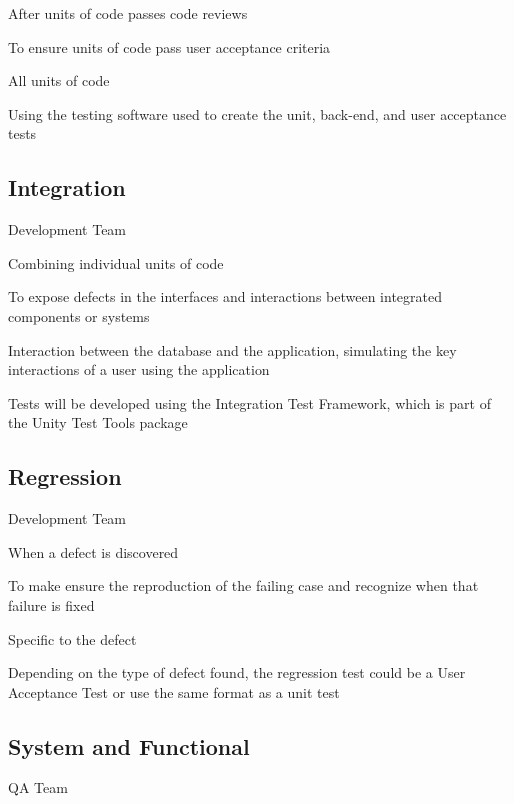 \documentclass[letterpaper,10pt,english,openany,oneside]{sphinxmanual}
\begin{document}
 After units of code passes code reviews

 To ensure units of code pass user acceptance criteria

 All units of code

 Using the testing software used to create the unit, back-end, and user acceptance tests


\subsection{Integration}
\label{\detokenize{test_plan/strategy:integration}}
 Development Team

 Combining individual units of code

 To expose defects in the interfaces and interactions between integrated components or systems

 Interaction between the database and the application, simulating the key interactions of a user using the application

 Tests will be developed using the Integration Test Framework, which is part of the Unity Test Tools package


\subsection{Regression}
\label{\detokenize{test_plan/strategy:regression}}
 Development Team

 When a defect is discovered

 To make ensure the reproduction of the failing case and recognize when that failure is fixed

 Specific to the defect

 Depending on the type of defect found, the regression test could be a User Acceptance Test or use the same format as a unit test


\subsection{System and Functional}
\label{\detokenize{test_plan/strategy:system-and-functional}}
 QA Team
\end{document}

